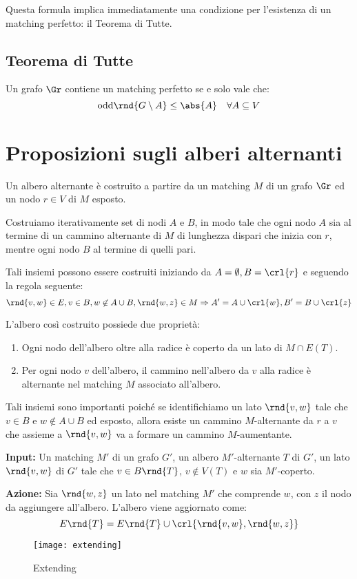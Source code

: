 \documentclass[\main/main.tex]{subfiles}
\begin{document}
Questa formula implica immediatamente una condizione per l'esistenza di un matching perfetto: il Teorema di Tutte.

\subsection{Teorema di Tutte}
\begin{theorem}
	Un grafo \(\Gr \) contiene un matching perfetto se e solo vale che:
	\[
		\text{odd}\rnd{G\setminus A} \leq \abs{A} \quad \forall A \subseteq V
	\]
\end{theorem}
\clearpage
\section{Proposizioni sugli alberi alternanti}
\begin{definition}
	Un albero alternante è costruito a partire da un matching \(M\) di un grafo \(\Gr \) ed un nodo \(r \in V\) di \(M\) esposto.

	Costruiamo iterativamente set di nodi \(A\) e \(B\), in modo tale che ogni nodo \(A\) sia al termine di un cammino alternante di \(M\) di lunghezza dispari che inizia con \(r\), mentre ogni nodo \(B\) al termine di quelli pari.

	Tali insiemi possono essere costruiti iniziando da \(A=\emptyset, B=\crl{r}\) e seguendo la regola seguente:
	\[
		\rnd{v,w} \in E, v \in B, w \not\in A \cup B, \rnd{w,z} \in M \Rightarrow A' = A \cup \crl{w}, B' = B \cup \crl{z}
	\]

	L'albero così costruito possiede due proprietà:
	\begin{enumerate}
		\item Ogni nodo dell'albero oltre alla radice è coperto da un lato di \(M \cap E(T)\).
		\item Per ogni nodo \(v\) dell'albero, il cammino nell'albero da \(v\) alla radice è alternante nel matching \(M\) associato all'albero.
	\end{enumerate}

	Tali insiemi sono importanti poiché se identifichiamo un lato \(\rnd{v, w}\) tale che \(v \in B\) e \(w \not\in A \cup B\) ed esposto, allora esiste un cammino \(M\)-alternante da \(r\) a \(v\) che assieme a \(\rnd{v, w}\) va a formare un cammino \(M\)-aumentante.
\end{definition}
\begin{definition}
	\textbf{Input:} Un matching \(M'\) di un grafo \(G'\), un albero \(M'\)-alternante \(T\) di \(G'\), un lato \(\rnd{v, w}\) di \(G'\) tale che \(v \in B\rnd{T}\), \(v \not\in V(T)\) e \(w\) sia \(M'\)-coperto.

	\textbf{Azione:} Sia \(\rnd{w, z}\) un lato nel matching \(M'\) che comprende \(w\), con \(z\) il nodo da aggiungere all'albero. L'albero viene aggiornato come:
	\[
		E\rnd{T} = E\rnd{T} \cup \crl{\rnd{v, w}, \rnd{w, z}}
	\]
	\begin{figure}
		\texttt{[image: extending]}
		\caption{Extending}
	\end{figure}
\end{definition}
\end{document}

